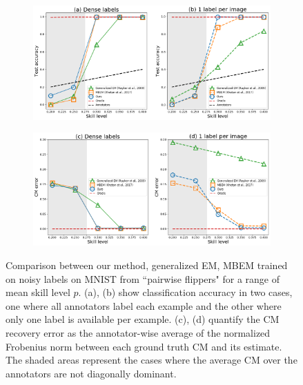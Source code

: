 \begin{figure}[ht]
	\center
	\begin{subfigure}[]{0.49\linewidth}
		\includegraphics[width=\linewidth]{chapter_4/figures/figures_new/figure_3_ab.png}
	\end{subfigure}
	\begin{subfigure}[]{0.49\linewidth}
		\includegraphics[width=\linewidth]{chapter_4/figures/figures_new/figure_3_cd.png}
	\end{subfigure}
	\caption{\small Comparison between our method, generalized EM, MBEM trained on noisy labels on MNIST from ``pairwise flippers" for a range of mean skill level $p$. (a), (b) show classification accuracy in two cases, one where all annotators label each example and the other where only one label is available per example. (c), (d) quantify the CM recovery error as the annotator-wise average of the normalized Frobenius norm between each ground truth CM and its estimate. The shaded areas represent the cases where the average CM over the annotators are not diagonally dominant. }
	\label{fig:pairwise_flips}
\end{figure}
